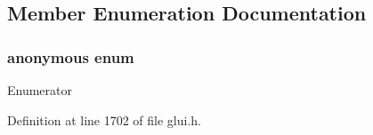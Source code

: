 \subsection{Member Enumeration Documentation}
\hypertarget{class_g_l_u_i___command_line_afcd6d744f2444c5a8cfbe053b5f37cd6}{\subsubsection[{anonymous enum}]{\setlength{\rightskip}{0pt plus 5cm}anonymous enum}}\label{class_g_l_u_i___command_line_afcd6d744f2444c5a8cfbe053b5f37cd6}
\begin{Desc}
\item[Enumerator]\par
\begin{description}
\item[{\em 
\hypertarget{class_g_l_u_i___command_line_afcd6d744f2444c5a8cfbe053b5f37cd6a991ecacadb37c63013e7e24f4e86496f}{H\+I\+S\+T\+\_\+\+S\+I\+Z\+E}\label{class_g_l_u_i___command_line_afcd6d744f2444c5a8cfbe053b5f37cd6a991ecacadb37c63013e7e24f4e86496f}
}]\end{description}
\end{Desc}


Definition at line 1702 of file glui.\+h.



